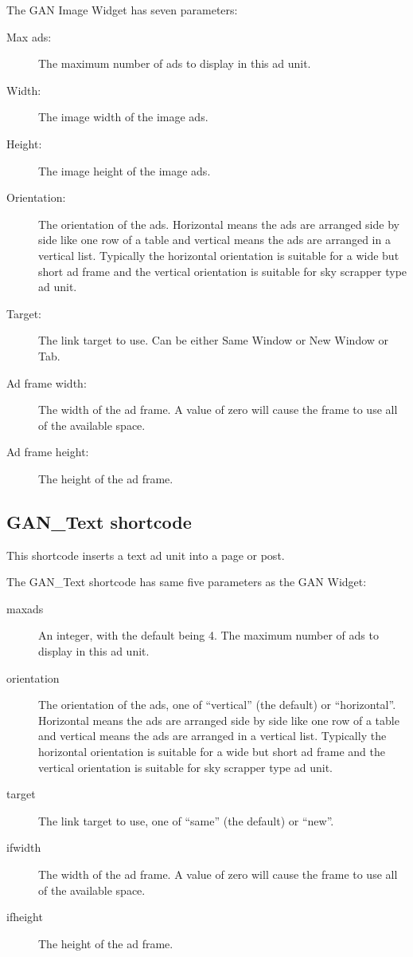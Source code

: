 \documentclass[letterpaper]{article}
\begin{document}
The GAN Image Widget has seven parameters:
\begin{description}
  \item[Max ads:] The maximum number of ads to display in this ad unit.
  \item[Width:] The image width of the image ads.
  \item[Height:] The image height of the image ads.
  \item[Orientation:] The orientation of the ads. Horizontal
means the ads are arranged side by side like one row of a table and
vertical means the ads are arranged in a vertical list. Typically the
horizontal orientation is suitable for a wide but short ad frame and the
vertical orientation is suitable for sky scrapper type ad unit.
  \item[Target:] The link target to use. Can be either Same 
Window or New Window or Tab.
  \item[Ad frame width:] The width of the ad frame. A value
of zero will cause the frame to use all of the available space.
  \item[Ad frame height:] The height of the ad frame.
\end{description}

\subsection{GAN\_Text shortcode}

This shortcode inserts a text ad unit into a page or post.

The GAN\_Text shortcode has same five parameters as the GAN
Widget:
\begin{description}
  \item[maxads] An integer, with the default being 4.
The maximum number of ads to display in this ad unit.
  \item[orientation] The orientation of the ads, one of
``vertical'' (the default) or ``horizontal''. Horizontal means the ads are
arranged side by side like one row of a table and      vertical means
the ads are arranged in a vertical list. Typically the horizontal
orientation is suitable for a wide but short ad frame and the vertical
orientation is suitable for sky scrapper type ad unit.
  \item[target] The link target to use, one of ``same'' (the
default) or ``new''.
  \item[ifwidth] The width of the ad frame. A value
of zero will cause the frame to use all of the available space.
  \item[ifheight] The height of the ad frame.
\end{description}
\end{document}
